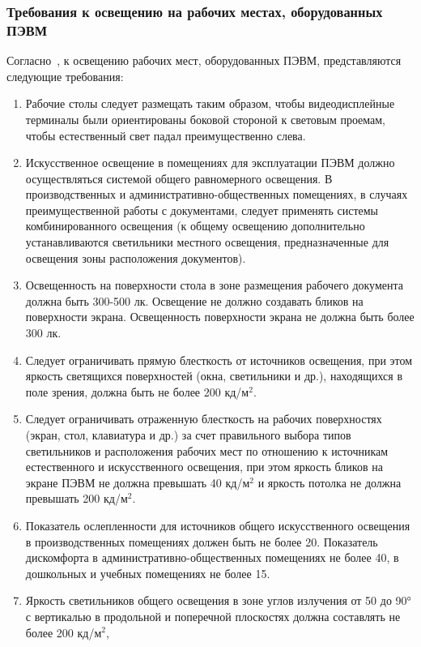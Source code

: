 \subsubsection{Требования к освещению на рабочих местах, оборудованных ПЭВМ}

Согласно~\cite{sanpin_2.4.1340-03}, к освещению рабочих мест, оборудованных ПЭВМ, представляются
следующие требования:
\begin{enumerate}
 \item Рабочие столы следует размещать таким образом, чтобы видеодисплейные 
 терминалы были ориентированы боковой стороной к световым проемам, чтобы естественный свет 
 падал преимущественно слева.
 \item Искусственное освещение в помещениях для эксплуатации ПЭВМ должно осуществляться 
 системой общего равномерного освещения. В производственных и административно-общественных помещениях, 
 в случаях преимущественной работы с документами, следует применять системы комбинированного освещения 
 (к общему освещению дополнительно устанавливаются светильники местного освещения, предназначенные для 
 освещения зоны расположения документов).
 \item Освещенность на поверхности стола в зоне размещения рабочего документа должна быть 300-500 лк. 
 Освещение не должно создавать бликов на поверхности экрана. Освещенность поверхности экрана не должна 
 быть более 300 лк.
 \item Следует ограничивать прямую блесткость от источников освещения, при этом яркость светящихся 
 поверхностей (окна, светильники и др.), находящихся в поле зрения, должна быть не более 200 кд/м$^{2}$.
 \item Следует ограничивать отраженную блесткость на рабочих поверхностях (экран, стол, клавиатура и др.) 
 за счет правильного выбора типов светильников и расположения рабочих мест по отношению к источникам 
 естественного и искусственного освещения, при этом яркость бликов на экране ПЭВМ не должна превышать
 40 кд/м$^{2}$ и яркость потолка не должна превышать 200 кд/м$^{2}$.
 \item Показатель ослепленности для источников общего искусственного освещения в 
 производственных помещениях должен быть не более 20. Показатель дискомфорта в административно-общественных 
 помещениях не более 40, в дошкольных и учебных помещениях не более 15.
 \item Яркость светильников общего освещения в зоне углов излучения от 50 до 90° с вертикалью в 
 продольной и поперечной плоскостях должна составлять не более 200 кд/м$^{2}$, 

\end{enumerate}
